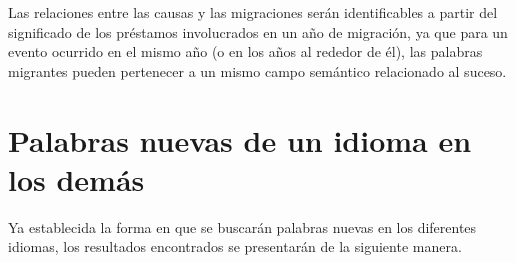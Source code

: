 Las relaciones entre las causas y las migraciones serán identificables a partir
del significado de los préstamos involucrados en un año de migración,  ya que
para un evento ocurrido en el mismo año (o en los años al rededor de él), las
palabras migrantes pueden pertenecer a un mismo campo semántico relacionado al
suceso.


















\section{Palabras nuevas de un idioma en los demás} %
 

Ya establecida la forma en que se buscarán  palabras nuevas en los diferentes idiomas,  los resultados encontrados se presentarán de la siguiente manera.


